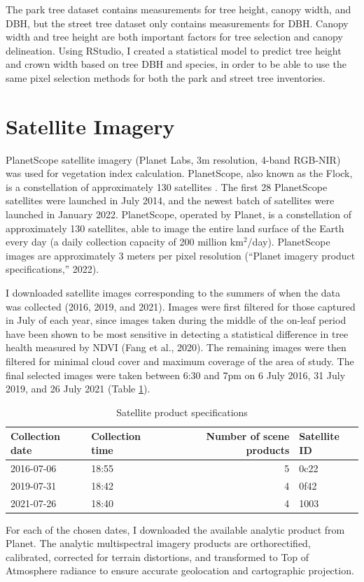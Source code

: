 \documentclass[12pt,twoside]{reedthesis}
\begin{document}
The park tree dataset contains measurements for tree height, canopy
width, and DBH, but the street tree dataset only contains measurements
for DBH. Canopy width and tree height are both important factors for
tree selection and canopy delineation. Using RStudio, I created a
statistical model to predict tree height and crown width based on tree
DBH and species, in order to be able to use the same pixel selection
methods for both the park and street tree inventories.

\hypertarget{satellite-imagery}{%
\section{Satellite Imagery}\label{satellite-imagery}}

PlanetScope satellite imagery (Planet Labs, 3m resolution, 4-band
RGB-NIR) was used for vegetation index calculation. PlanetScope, also
known as the Flock, is a constellation of approximately 130 satellites .
The first 28 PlanetScope satellites were launched in July 2014, and the
newest batch of satellites were launched in January 2022. PlanetScope,
operated by Planet, is a constellation of approximately 130 satellites,
able to image the entire land surface of the Earth every day (a daily
collection capacity of 200 million km\(^2\)/day). PlanetScope images are
approximately 3 meters per pixel resolution ({``Planet imagery product specifications,''} 2022).

I downloaded satellite images corresponding to the summers of when the
data was collected (2016, 2019, and 2021). Images were first filtered
for those captured in July of each year, since images taken during the
middle of the on-leaf period have been shown to be most sensitive in
detecting a statistical difference in tree health measured by NDVI
(Fang et al., 2020). The remaining images were then filtered for minimal cloud
cover and maximum coverage of the area of study. The final selected
images were taken between 6:30 and 7pm on 6 July 2016, 31 July 2019, and
26 July 2021 (Table \ref{tab:sat-products}).
\begin{longtable}[t]{llrl}
\caption{\label{tab:sat-products}Satellite product specifications}\\
\toprule
Collection date & Collection time & Number of scene products & Satellite ID\\
\midrule
2016-07-06 & 18:55 & 5 & 0c22\\
2019-07-31 & 18:42 & 4 & 0f42\\
2021-07-26 & 18:40 & 4 & 1003\\
\bottomrule
\end{longtable}
For each of the chosen dates, I downloaded the available analytic
product from Planet. The analytic multispectral imagery products are
orthorectified, calibrated, corrected for terrain distortions, and
transformed to Top of Atmosphere radiance to ensure accurate geolocation
and cartographic projection.
\end{document}
